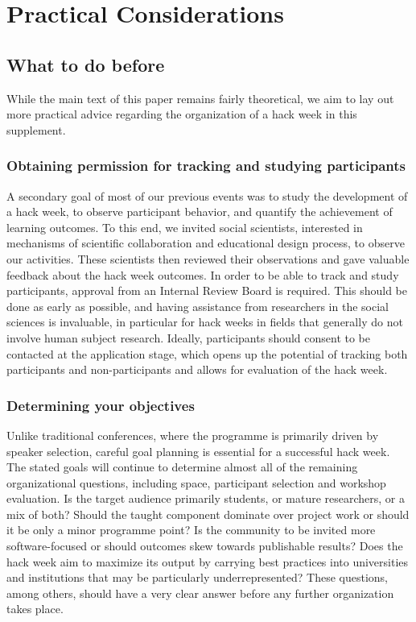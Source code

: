\documentclass{aastex62}
\begin{document}
\clearpage

\section{Practical Considerations}
\subsection{What to do before}

\noindent While the main text of this paper remains fairly theoretical, we aim to lay out more practical advice regarding the organization of a hack week in this supplement. 

\subsubsection{Obtaining permission for tracking and studying participants}
A secondary goal of most of our previous events was to study the development of a hack week, to observe participant behavior, and quantify the achievement of learning outcomes. To this end, we invited social scientists, interested in mechanisms of scientific collaboration and educational design process, to observe our activities. These scientists then reviewed their observations and gave valuable feedback about the hack week outcomes. In order to be able to track and study participants, approval from an Internal Review Board is required. This should be done as early as possible, and having assistance from researchers in the social sciences is invaluable, in particular for hack weeks in fields that generally do not involve human subject research. Ideally, participants should consent to be contacted at the application stage, which opens up the potential of tracking both participants and non-participants and allows for evaluation of the hack week.

\subsubsection{Determining your objectives}

Unlike traditional conferences, where the programme is primarily driven by speaker selection, careful goal planning is essential for a successful hack week. The stated goals will continue to determine almost all of the remaining organizational questions, including space, participant selection and workshop evaluation. Is the target audience primarily students, or mature researchers, or a mix of both? Should the taught component dominate over project work or should it be only a minor programme point? Is the community to be invited more software-focused or should outcomes skew towards publishable results? Does the hack week aim to maximize its output by carrying best practices into universities and institutions that may be particularly underrepresented? These questions, among others, should have a very clear answer before any further organization takes place.
\end{document}
